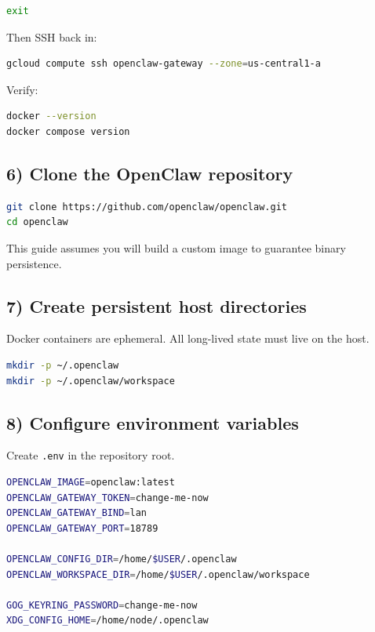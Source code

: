 \begin{lstlisting}[language=bash]
exit
\end{lstlisting}


Then SSH back in:

\begin{lstlisting}[language=bash]
gcloud compute ssh openclaw-gateway --zone=us-central1-a
\end{lstlisting}


Verify:

\begin{lstlisting}[language=bash]
docker --version
docker compose version
\end{lstlisting}


\hrulefill


\subsection{6) Clone the OpenClaw repository}


\begin{lstlisting}[language=bash]
git clone https://github.com/openclaw/openclaw.git
cd openclaw
\end{lstlisting}


This guide assumes you will build a custom image to guarantee binary persistence.

\hrulefill


\subsection{7) Create persistent host directories}


Docker containers are ephemeral.
All long-lived state must live on the host.

\begin{lstlisting}[language=bash]
mkdir -p ~/.openclaw
mkdir -p ~/.openclaw/workspace
\end{lstlisting}


\hrulefill


\subsection{8) Configure environment variables}


Create \texttt{.env} in the repository root.

\begin{lstlisting}[language=bash]
OPENCLAW_IMAGE=openclaw:latest
OPENCLAW_GATEWAY_TOKEN=change-me-now
OPENCLAW_GATEWAY_BIND=lan
OPENCLAW_GATEWAY_PORT=18789

OPENCLAW_CONFIG_DIR=/home/$USER/.openclaw
OPENCLAW_WORKSPACE_DIR=/home/$USER/.openclaw/workspace

GOG_KEYRING_PASSWORD=change-me-now
XDG_CONFIG_HOME=/home/node/.openclaw
\end{lstlisting}


